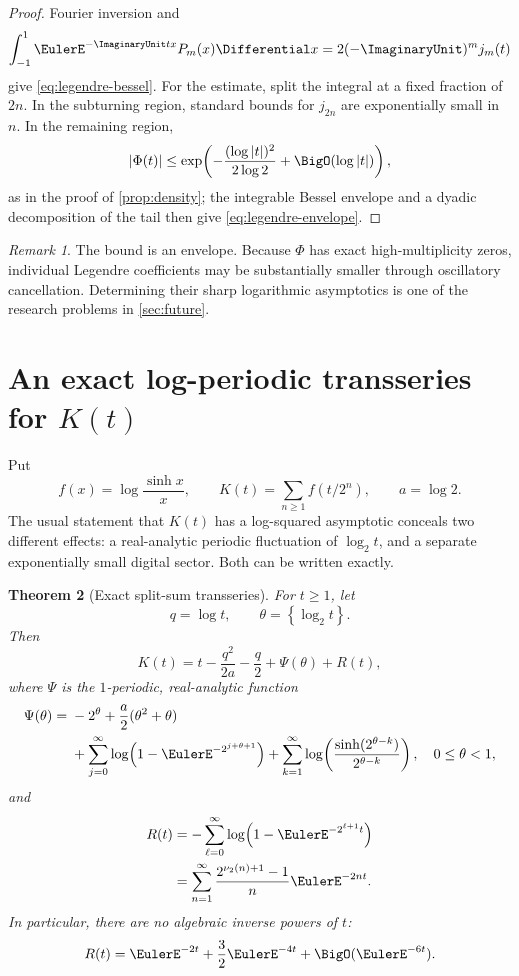 \documentclass[11pt,oneside]{article}
\newtheorem{theorem}{Theorem}[section]
\theoremstyle{definition}
\theoremstyle{remark}
\newtheorem{remark}[theorem]{Remark}
\begin{document}
\begin{proof}
Fourier inversion and
\[
 \int_{-1}^{1}\EulerE^{-\ImaginaryUnit tx}P_m(x)\Differential x
 =2(-\ImaginaryUnit)^m j_m(t)
\]
give \eqref{eq:legendre-bessel}.  For the estimate, split the integral at a
fixed fraction of \(2n\).  In the subturning region, standard bounds for
\(j_{2n}\) are exponentially small in \(n\).  In the remaining region,
\[
 |\Phi(t)|
 \leq
 \exp\!\left(
  -\frac{(\log|t|)^2}{2\log2}+\BigO(\log|t|)
 \right),
\]
as in the proof of \cref{prop:density}; the integrable Bessel envelope and a
dyadic decomposition of the tail then give \eqref{eq:legendre-envelope}.
\end{proof}

\begin{remark}
The bound is an envelope.  Because \(\Phi\) has exact high-multiplicity zeros,
individual Legendre coefficients may be substantially smaller through
oscillatory cancellation.  Determining their sharp logarithmic asymptotics is
one of the research problems in \cref{sec:future}.
\end{remark}

\section{An exact log-periodic transseries for \(K(t)\)}

Put
\[
 f(x)=\log\frac{\sinh x}{x},
 \qquad
 K(t)=\sum_{n\geq1}f(t/2^n),
 \qquad a=\log2.
\]
The usual statement that \(K(t)\) has a log-squared asymptotic conceals two
different effects: a real-analytic periodic fluctuation of \(\log_2t\), and a
separate exponentially small digital sector.  Both can be written exactly.

\begin{theorem}[Exact split-sum transseries]
\label{thm:exact-transseries}
For \(t\geq1\), let
\[
 q=\log t,\qquad \theta=\left\{\log_2t\right\}.
\]
Then
\begin{equation}
 \boxed{\displaystyle
 K(t)
 =t-\frac{q^2}{2a}-\frac q2+\Psi(\theta)+R(t),}
 \label{eq:K-transseries}
\end{equation}
where \(\Psi\) is the \(1\)-periodic, real-analytic function
\begin{align}
 \Psi(\theta)
 ={}&
 -2^\theta+\frac a2(\theta^2+\theta)
 \notag\\
 &+\sum_{j=0}^{\infty}
   \log\!\left(1-\EulerE^{-2^{j+\theta+1}}\right)
 +\sum_{k=1}^{\infty}
   \log\!\left(
    \frac{\sinh(2^{\theta-k})}{2^{\theta-k}}
   \right),
 \quad 0\leq\theta<1,
 \label{eq:Psi-split}
\end{align}
and
\begin{align}
 R(t)
 &=-\sum_{\ell=0}^{\infty}
   \log\!\left(1-\EulerE^{-2^{\ell+1}t}\right)
 \label{eq:R-product}\\
 &=\sum_{n=1}^{\infty}
   \frac{2^{\nu_2(n)+1}-1}{n}\EulerE^{-2nt}.
 \label{eq:R-digital}
\end{align}
In particular, there are no algebraic inverse powers of \(t\):
\[
 R(t)=\EulerE^{-2t}+\frac32\EulerE^{-4t}+\BigO(\EulerE^{-6t}).
\]
\end{theorem}
\end{document}
